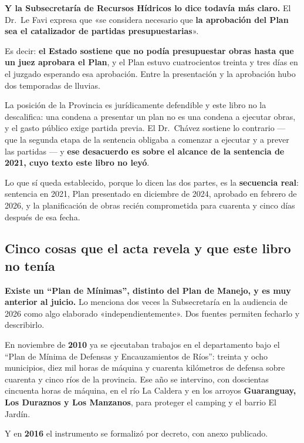 \textbf{Y la Subsecretaría de Recursos Hídricos lo dice todavía más claro.} El Dr.\ Le Favi
expresa que «se considera necesario que \textbf{la aprobación del Plan sea el catalizador de
partidas presupuestarias}».

Es decir: \textbf{el Estado sostiene que no podía presupuestar obras hasta que un juez
aprobara el Plan}, y el Plan estuvo cuatrocientos treinta y tres días en el juzgado esperando esa
aprobación. Entre la presentación y la aprobación hubo dos temporadas de lluvias.

\begin{cautela}
La posición de la Provincia es jurídicamente defendible y este libro no la descalifica: una
condena a presentar un plan no es una condena a ejecutar obras, y el gasto público exige
partida previa. El Dr.\ Chávez sostiene lo contrario --- que la segunda etapa de la sentencia
obligaba a comenzar a ejecutar y a prever las partidas --- y \textbf{ese desacuerdo es sobre
el alcance de la sentencia de 2021, cuyo texto este libro no leyó}.

Lo que sí queda establecido, porque lo dicen las dos partes, es la \textbf{secuencia real}:
sentencia en 2021, Plan presentado en diciembre de 2024, aprobado en febrero de 2026, y la
planificación de obras recién comprometida para cuarenta y cinco días después de esa fecha.
\end{cautela}

\subsection*{Cinco cosas que el acta revela y que este libro no tenía}

\textbf{Existe un ``Plan de Mínimas'', distinto del Plan de Manejo, y es muy anterior al
juicio.} Lo menciona dos veces la Subsecretaría en la audiencia de 2026 como algo elaborado
«independientemente». Dos fuentes permiten fecharlo y describirlo.

En noviembre de \textbf{2010} ya se ejecutaban trabajos en el departamento bajo el ``Plan de
Mínima de Defensas y Encauzamientos de Ríos'': treinta y ocho municipios, diez mil horas de
máquina y cuarenta kilómetros de defensa sobre cuarenta y cinco ríos de la provincia. Ese año
se intervino, con doscientas cincuenta horas de máquina, en el río La Caldera y en los
arroyos \textbf{Guaranguay, Los Duraznos y Los Manzanos}, para proteger el camping y el barrio
El Jardín.

Y en \textbf{2016} el instrumento se formalizó por decreto, con anexo publicado.

